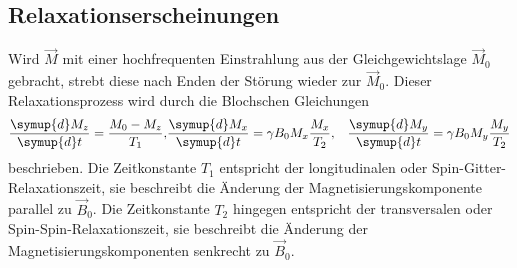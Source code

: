 \subsection{Relaxationserscheinungen}
Wird $\vec{M}$ mit einer hochfrequenten Einstrahlung
aus der Gleichgewichtslage $\vec{M}_0$
gebracht, strebt diese
nach Enden der Störung wieder zur $\vec{M}_0$.
Dieser Relaxationsprozess wird durch die
Blochschen Gleichungen
\begin{align}
  \frac{\symup{d}M_z}{\symup{d}t}=\frac{M_0-M_z}{T_1},
  &\frac{\symup{d}M_x}{\symup{d}t}=\gamma B_0 M_x\frac{M_x}{T_2},
  &\frac{\symup{d}M_y}{\symup{d}t}=\gamma B_0 M_y\frac{M_y}{T_2} \label{eqn:bloch}
\end{align}
beschrieben.
Die Zeitkonstante $T_1$ entspricht
der longitudinalen oder Spin-Gitter-Relaxationszeit, sie
beschreibt die Änderung der Magnetisierungskomponente parallel zu
$\vec{B}_0$. Die Zeitkonstante $T_2$ hingegen entspricht
der transversalen oder Spin-Spin-Relaxationszeit, sie
beschreibt die Änderung der Magnetisierungskomponenten
senkrecht zu $\vec{B}_0$.

